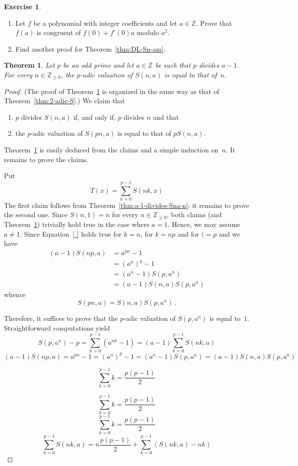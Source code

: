 \documentclass[12pt]{article}
\newcommand{\bZ}{\mathbb{Z}}
\newcommand{\bN}{\bZ_{\ge 0}}%
\newtheorem{theorem}{Theorem}
\theoremstyle{definition}
\newtheorem{exercise}{Exercise}
\begin{document}
 \begin{exercise}
 \begin{enumerate}
 \item Let $f$ be a polynomial with integer coefficients and let $a \in \bZ$.
   Prove that $f(a)$ is congruent of $f(0) + f'(0) a$ modulo $a^2$.
 \item Find another proof for Theorem~\ref{thm:DL-Sn-am}.
 \end{enumerate}
\end{exercise}

\begin{theorem} \label{thm:p-adic-S}
  Let $p$ be an odd prime and let $a \in \bZ$ be such that $p$ divides $a - 1$.
  For every $n \in \bN$, the $p$-adic valuation of $S(n, a)$ is equal to that of~$n$.
\end{theorem}

\begin{proof}
  (The proof of Theorem~\ref{thm:p-adic-S} is organized in the same way as that of Theorem~\ref{thm:2-adic-S}.)
  We claim that
  \begin{enumerate}
  \item $p$ divides $S(n, a)$ if, and only if, $p$ divides $n$ and that
  \item the $p$-adic valuation of $S(p n, a)$ is equal to that of $p S(n, a)$.
  \end{enumerate}
  Theorem~\ref{thm:p-adic-S} is easily deduced from the claims and a simple induction on~$n$.
  It remains to prove the claims.

  Put
  $$
  T(x) = \sum_{k = 0}^{p - 1} S(n k, x) 
  $$
  The first claim follows from Theorem~\ref{thm:a-1-divides-Sna-n};
  it remains to prove the second one.
  Since $S(n, 1) = n$ for every $n \in \bN$,
  both claims (and Theorem~\ref{thm:p-adic-S}) trivially hold true in the case where $a = 1$.
  Hence, we may assume $a \ne 1$.
  Since Equation~\eqref{ } holds true for $k = n$, for $k = np$ and for $( = p$ and we have 
\begin{align*}
(a - 1) S(np, a)
& = a^{pn} - 1 \\
& = {(a^n)}^p - 1  \\
& = (a^n - 1)S(p, a^n) \\
& = (a - 1) S(n, a) S(p, a^n) 
\end{align*}
whence
$$
S(pn, a) = S(n, a) S(p, a^n) \, . 
$$


Therefore, it suffices to prove that the $p$-adic valuation of $S(p, a^n)$ is equal to~$1$.
Straightforward computations yield
$$
S(p, a^n) - p 
= \sum_{k = 0}^{p - 1} (a^{n k} - 1)
= (a - 1) \sum_{k = 0}^{p - 1} S(n k, a)  
$$
$$
(a - 1) S(np, a)
 = a^{pn} - 1
 = {(a^n)}^p - 1 
 = (a^n - 1)S(p, a^n)
 = (a - 1) S(n, a) S(p, a^n)
 $$
 
$$
\sum_{k = 0}^{p - 1} k = \frac{p(p - 1)}{2} 
$$

$$
\sum_{k = 0}^{p - 1} k = \frac{p(p - 1)}{2} 
$$%
$$
\sum_{k = 0}^{p - 1} k = \frac{p(p - 1)}{2} 
$$
$$
\sum_{k = 0}^{p - 1} S(n k, a) = n \frac{p(p - 1)}{2} + \sum_{k = 0}^{p - 1} \left( S(n k, a) - n k \right)  
$$
\end{proof}
\end{document}
